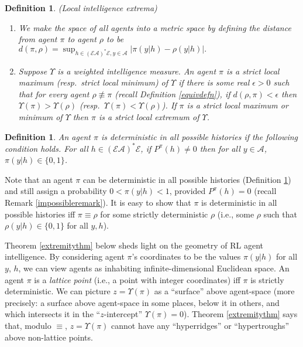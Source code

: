 \documentclass[twoside]{article}
\newtheorem{definition}[theorem]{Definition}
\begin{document}
\begin{definition}
    (Local intelligence extrema)
    \begin{enumerate}
    \item
        We make the space of all agents into a metric space by defining
        the distance from agent $\pi$
        to agent $\rho$ to be
        $
            d(\pi,\rho)
            =
            \sup_{h\in(\mathcal E\mathcal A)^*\mathcal E,y\in\mathcal A}\left|
                \pi(y|h) - \rho(y|h)
            \right|.
        $
    \item
        Suppose $\Upsilon$ is a weighted intelligence measure. An agent $\pi$
        is a \emph{strict local maximum} (resp.\ \emph{strict local minimum})
        of $\Upsilon$ if there is some real $\epsilon>0$
        such that for every agent $\rho\not\equiv\pi$
        (recall Definition \ref{equivdefn}), if $d(\rho,\pi)<\epsilon$
        then $\Upsilon(\pi)>\Upsilon(\rho)$ (resp.\ $\Upsilon(\pi)<\Upsilon(\rho)$).
        If $\pi$ is a strict local maximum or minimum of $\Upsilon$ then
        $\pi$ is a \emph{strict local extremum} of $\Upsilon$.
    \end{enumerate}
\end{definition}

\begin{definition}
\label{deterministicinpracticedefn}
    An agent $\pi$ is \emph{deterministic in all possible histories}
    if the following condition
    holds. For all $h\in(\mathcal E\mathcal A)^*\mathcal E$,
    if $P^\pi(h)\not=0$ then for all $y\in\mathcal A$,
    $\pi(y|h)\in\{0,1\}$.
\end{definition}

Note that an agent $\pi$ can be deterministic in all possible histories
(Definition \ref{deterministicinpracticedefn}) and still assign a
probability $0<\pi(y|h)<1$, provided $P^\pi(h)=0$ (recall Remark \ref{impossibleremark}).
It is easy to show that $\pi$ is deterministic in all possible histories iff $\pi\equiv\rho$
for some strictly
deterministic $\rho$ (i.e., some $\rho$ such that $\rho(y|h)\in\{0,1\}$ for
all $y,h$).

Theorem \ref{extremitythm} below sheds light on the geometry of RL agent intelligence.
By considering agent $\pi$'s coordinates to be
the values $\pi(y|h)$
for all $y$, $h$, we can view agents as inhabiting
infinite-dimensional Euclidean space.
An agent $\pi$ is a \emph{lattice point} (i.e., a point with integer coordinates)
iff $\pi$ is strictly deterministic.
We can picture $z=\Upsilon(\pi)$ as a ``surface'' above
agent-space
(more precisely: a surface above agent-space in some places,
below it in others, and which intersects it in the ``$z$-intercept''
$\Upsilon(\pi)=0$).
Theorem \ref{extremitythm} says that, modulo $\equiv$,
$z=\Upsilon(\pi)$
cannot have any ``hyperridges'' or ``hypertroughs'' above non-lattice points.
\end{document}
